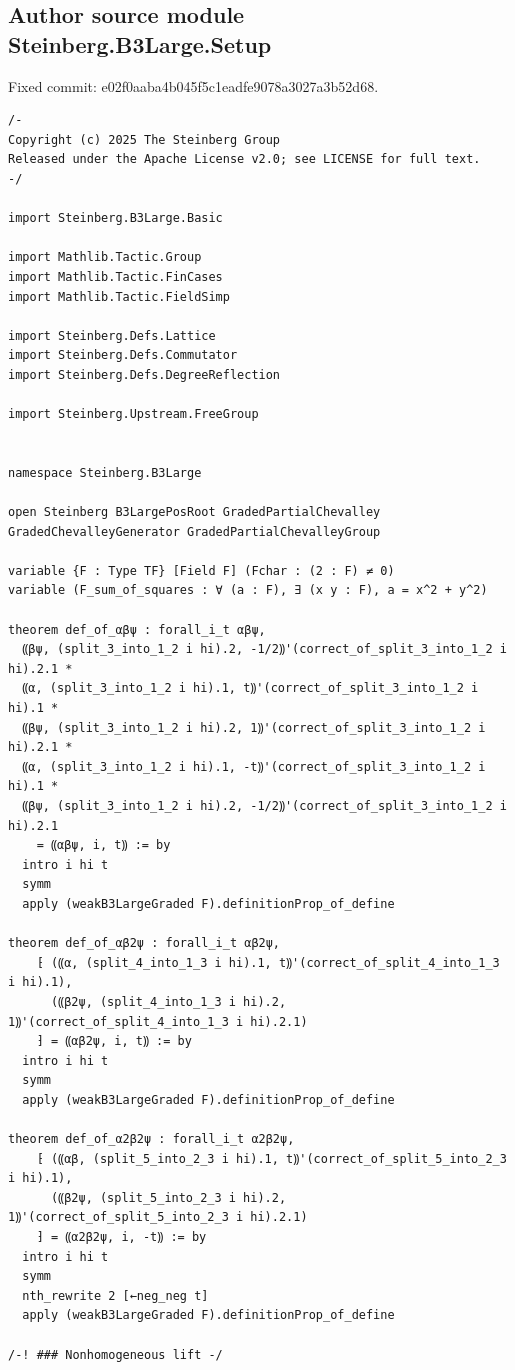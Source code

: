 \documentclass[10pt,a4paper]{article}
\begin{document}
\subsection*{Author source module Steinberg.B3Large.Setup}
\noindent Fixed commit: e02f0aaba4b045f5c1eadfe9078a3027a3b52d68.
\begin{Verbatim}
/-
Copyright (c) 2025 The Steinberg Group
Released under the Apache License v2.0; see LICENSE for full text.
-/

import Steinberg.B3Large.Basic

import Mathlib.Tactic.Group
import Mathlib.Tactic.FinCases
import Mathlib.Tactic.FieldSimp

import Steinberg.Defs.Lattice
import Steinberg.Defs.Commutator
import Steinberg.Defs.DegreeReflection

import Steinberg.Upstream.FreeGroup


namespace Steinberg.B3Large

open Steinberg B3LargePosRoot GradedPartialChevalley GradedChevalleyGenerator GradedPartialChevalleyGroup

variable {F : Type TF} [Field F] (Fchar : (2 : F) ≠ 0)
variable (F_sum_of_squares : ∀ (a : F), ∃ (x y : F), a = x^2 + y^2)

theorem def_of_αβψ : forall_i_t αβψ,
  ⸨βψ, (split_3_into_1_2 i hi).2, -1/2⸩'(correct_of_split_3_into_1_2 i hi).2.1 *
  ⸨α, (split_3_into_1_2 i hi).1, t⸩'(correct_of_split_3_into_1_2 i hi).1 *
  ⸨βψ, (split_3_into_1_2 i hi).2, 1⸩'(correct_of_split_3_into_1_2 i hi).2.1 *
  ⸨α, (split_3_into_1_2 i hi).1, -t⸩'(correct_of_split_3_into_1_2 i hi).1 *
  ⸨βψ, (split_3_into_1_2 i hi).2, -1/2⸩'(correct_of_split_3_into_1_2 i hi).2.1
    = ⸨αβψ, i, t⸩ := by
  intro i hi t
  symm
  apply (weakB3LargeGraded F).definitionProp_of_define

theorem def_of_αβ2ψ : forall_i_t αβ2ψ,
    ⁅ (⸨α, (split_4_into_1_3 i hi).1, t⸩'(correct_of_split_4_into_1_3 i hi).1),
      (⸨β2ψ, (split_4_into_1_3 i hi).2, 1⸩'(correct_of_split_4_into_1_3 i hi).2.1)
    ⁆ = ⸨αβ2ψ, i, t⸩ := by
  intro i hi t
  symm
  apply (weakB3LargeGraded F).definitionProp_of_define

theorem def_of_α2β2ψ : forall_i_t α2β2ψ,
    ⁅ (⸨αβ, (split_5_into_2_3 i hi).1, t⸩'(correct_of_split_5_into_2_3 i hi).1),
      (⸨β2ψ, (split_5_into_2_3 i hi).2, 1⸩'(correct_of_split_5_into_2_3 i hi).2.1)
    ⁆ = ⸨α2β2ψ, i, -t⸩ := by
  intro i hi t
  symm
  nth_rewrite 2 [←neg_neg t]
  apply (weakB3LargeGraded F).definitionProp_of_define

/-! ### Nonhomogeneous lift -/


\end{Verbatim}
\end{document}
